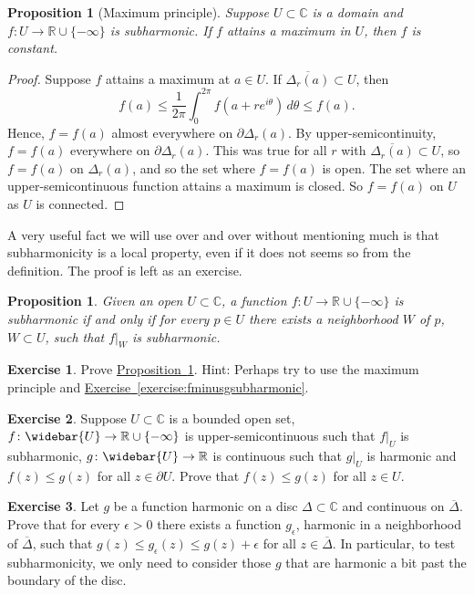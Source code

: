\documentclass[12pt,openany]{book}
\newcommand{\C}{{\mathbb{C}}}
\newcommand{\R}{{\mathbb{R}}}
\theoremstyle{plain}
\newtheorem{prop}[thm]{Proposition}
\theoremstyle{remark}
\theoremstyle{definition}
\newenvironment{exbox}{%
    \def\FrameCommand{\vrule width 1pt \relax\hspace{10pt}}%
    \MakeFramed{\advance\hsize-\width\FrameRestore}%
}{%
    \endMakeFramed
}
\theoremstyle{exercise}
\newtheorem{exercise}{Exercise}[section]
\theoremstyle{example}
\newcommand{\exerciseref}[1]{\hyperref[#1]{Exercise~\ref*{#1}}}
\newcommand{\propref}[1]{\hyperref[#1]{Proposition~\ref*{#1}}}
\begin{document}
\begin{prop}[Maximum principle]
Suppose $U \subset \C$ is a domain and $f \colon U \to \R \cup \{ -\infty \}$
is subharmonic.  If $f$ attains a maximum in $U$, then $f$ is constant.
\end{prop}

\begin{proof}
Suppose $f$ attains a maximum at $a \in U$.
If
$\overline{\Delta_r(a)} \subset U$, then
\begin{equation*}
f(a) \leq \frac{1}{2\pi} \int_0^{2\pi} f(a+re^{i\theta})\, d\theta \leq f(a)
.
\end{equation*}
Hence, $f = f(a)$ almost everywhere on $\partial \Delta_r(a)$.
By upper-semicontinuity, $f = f(a)$ everywhere on $\partial \Delta_r(a)$.
This was true for all $r$
with $\overline{\Delta_r(a)} \subset U$, so $f=f(a)$ on $\Delta_r(a)$,
and so the set where $f=f(a)$ is open.  The set where an upper-semicontinuous
function attains a maximum is closed.  So $f=f(a)$ on $U$ as $U$ is
connected.
\end{proof}

A very useful fact we will use over and over without mentioning much is that subharmonicity
is a local property,
even if it does not seems so from the
definition.  The proof is left as an exercise.

\begin{prop} \label{prop:shlocal}
Given an open
$U \subset \C$, a function $f \colon U \to \R \cup \{ -\infty \}$ is subharmonic if
and only if for every $p \in U$ there exists a neighborhood $W$ of $p$,
$W \subset U$, such that $f|_{W}$ is subharmonic.  \end{prop}

\begin{exbox}
\begin{exercise}
Prove \propref{prop:shlocal}.
Hint: Perhaps try to use
the maximum principle and \exerciseref{exercise:fminusgsubharmonic}.
\end{exercise}

\begin{exercise}
Suppose $U \subset \C$ is a bounded open set, $f \colon \widebar{U} \to \R
\cup \{-\infty\}$ is upper-semicontinuous such that $f|_U$
is subharmonic, $g \colon \widebar{U} \to \R$ is continuous
such that $g|_U$ is harmonic and
$f(z) \leq g(z)$ for all $z \in \partial U$.  Prove that
$f(z) \leq g(z)$ for all $z \in U$.
\end{exercise}

\begin{exercise} \label{exercise:onlyniceuneededforsubharmonic}
Let $g$ be a function
harmonic on a disc $\Delta \subset \C$ and continuous on
$\overline{\Delta}$.  Prove that for every $\epsilon > 0$ there exists
a function $g_\epsilon$, harmonic in a neighborhood of $\overline{\Delta}$,
such that $g(z) \leq g_\epsilon(z) \leq g(z)+\epsilon$ for all $z \in
\overline{\Delta}$.
In particular, to test subharmonicity, we only need to consider those
$g$ that are harmonic a bit past the boundary of the disc.
\end{exercise}
\end{exbox}
\end{document}

